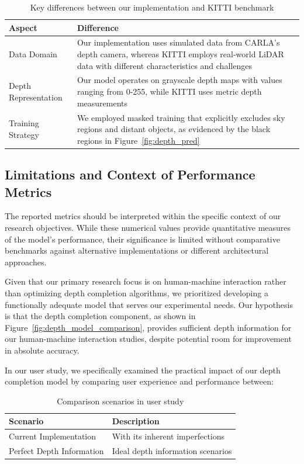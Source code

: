 \begin{table}[h]
\centering
\begin{tabular}{p{}p{}}
\hline
\textbf{Aspect} & \textbf{Difference} \\
\hline
Data Domain & Our implementation uses simulated data from CARLA's depth camera, whereas KITTI employs real-world \ac{LiDAR} data with different characteristics and challenges \\
Depth Representation & Our model operates on grayscale depth maps with values ranging from 0-255, while KITTI uses metric depth measurements \\
Training Strategy & We employed masked training that explicitly excludes sky regions and distant objects, as evidenced by the black regions in Figure~\ref{fig:depth_pred} \\
\hline
\end{tabular}
\caption{Key differences between our implementation and KITTI benchmark}
\label{tab:implementation_differences}
\end{table}

\subsection{Limitations and Context of Performance Metrics}

The reported metrics should be interpreted within the specific context of our research objectives. While these numerical values provide quantitative measures of the model's performance, their significance is limited without comparative benchmarks against alternative implementations or different architectural approaches.

Given that our primary research focus is on human-machine interaction rather than optimizing depth completion algorithms, we prioritized developing a functionally adequate model that serves our experimental needs. Our hypothesis is that the depth completion component, as shown in Figure~\ref{fig:depth_model_comparison}, provides sufficient depth information for our human-machine interaction studies, despite potential room for improvement in absolute accuracy.

In our user study, we specifically examined the practical impact of our depth completion model by comparing user experience and performance between:

\begin{table}[h]
\centering
\begin{tabular}{ll}
\hline
\textbf{Scenario} & \textbf{Description} \\
\hline
Current Implementation & With its inherent imperfections \\
Perfect Depth Information & Ideal depth information scenarios \\
\hline
\end{tabular}
\caption{Comparison scenarios in user study}
\label{tab:comparison_scenarios}
\end{table}

